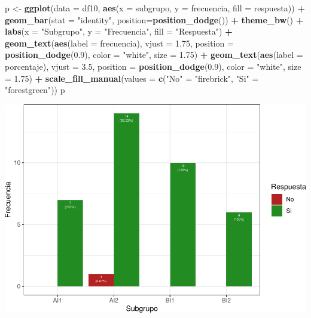 \documentclass[
]{article}
\newenvironment{Shaded}{\begin{snugshade}}{\end{snugshade}}
\newcommand{\AttributeTok}[1]{\textcolor[rgb]{0.13,0.29,0.53}{#1}}
\newcommand{\FloatTok}[1]{\textcolor[rgb]{0.00,0.00,0.81}{#1}}
\newcommand{\FunctionTok}[1]{\textcolor[rgb]{0.13,0.29,0.53}{\textbf{#1}}}
\newcommand{\NormalTok}[1]{#1}
\newcommand{\OtherTok}[1]{\textcolor[rgb]{0.56,0.35,0.01}{#1}}
\newcommand{\SpecialCharTok}[1]{\textcolor[rgb]{0.81,0.36,0.00}{\textbf{#1}}}
\newcommand{\StringTok}[1]{\textcolor[rgb]{0.31,0.60,0.02}{#1}}
\begin{document}
\begin{Shaded}
\begin{Highlighting}[]
\NormalTok{p }\OtherTok{\textless{}{-}} \FunctionTok{ggplot}\NormalTok{(}\AttributeTok{data =}\NormalTok{ df10, }\FunctionTok{aes}\NormalTok{(}\AttributeTok{x =}\NormalTok{ subgrupo, }\AttributeTok{y =}\NormalTok{ frecuencia, }\AttributeTok{fill =}\NormalTok{ respuesta)) }\SpecialCharTok{+} 
  \FunctionTok{geom\_bar}\NormalTok{(}\AttributeTok{stat =} \StringTok{"identity"}\NormalTok{, }\AttributeTok{position=}\FunctionTok{position\_dodge}\NormalTok{()) }\SpecialCharTok{+}
  \FunctionTok{theme\_bw}\NormalTok{() }\SpecialCharTok{+} \FunctionTok{labs}\NormalTok{(}\AttributeTok{x =} \StringTok{"Subgrupo"}\NormalTok{, }\AttributeTok{y =} \StringTok{"Frecuencia"}\NormalTok{, }\AttributeTok{fill =} \StringTok{"Respuesta"}\NormalTok{) }\SpecialCharTok{+}
  \FunctionTok{geom\_text}\NormalTok{(}\FunctionTok{aes}\NormalTok{(}\AttributeTok{label =}\NormalTok{ frecuencia), }\AttributeTok{vjust =} \FloatTok{1.75}\NormalTok{, }\AttributeTok{position =} \FunctionTok{position\_dodge}\NormalTok{(}\FloatTok{0.9}\NormalTok{), }
            \AttributeTok{color =} \StringTok{"white"}\NormalTok{, }\AttributeTok{size =} \FloatTok{1.75}\NormalTok{) }\SpecialCharTok{+}
  \FunctionTok{geom\_text}\NormalTok{(}\FunctionTok{aes}\NormalTok{(}\AttributeTok{label =}\NormalTok{ porcentaje), }\AttributeTok{vjust =} \FloatTok{3.5}\NormalTok{, }\AttributeTok{position =} \FunctionTok{position\_dodge}\NormalTok{(}\FloatTok{0.9}\NormalTok{), }
            \AttributeTok{color =} \StringTok{"white"}\NormalTok{, }\AttributeTok{size =} \FloatTok{1.75}\NormalTok{) }\SpecialCharTok{+}
  \FunctionTok{scale\_fill\_manual}\NormalTok{(}\AttributeTok{values =} \FunctionTok{c}\NormalTok{(}\StringTok{"No"} \OtherTok{=} \StringTok{"firebrick"}\NormalTok{, }\StringTok{"Si"} \OtherTok{=} \StringTok{"forestgreen"}\NormalTok{))}
\NormalTok{p}
\end{Highlighting}
\end{Shaded}

\includegraphics{informe_files/figure-latex/unnamed-chunk-11-1.pdf}
\end{document}

